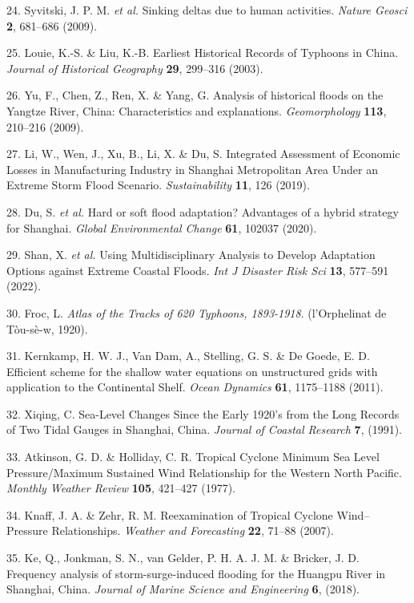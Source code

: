 \documentclass[
]{article}
\begin{document}
24. Syvitski, J. P. M. \emph{et al.} Sinking deltas due to human
activities. \emph{Nature Geosci} \textbf{2}, 681--686 (2009).

25. Louie, K.-S. \& Liu, K.-B. Earliest Historical Records of Typhoons
in China. \emph{Journal of Historical Geography} \textbf{29}, 299--316
(2003).

26. Yu, F., Chen, Z., Ren, X. \& Yang, G. Analysis of historical floods
on the Yangtze River, China: Characteristics and explanations.
\emph{Geomorphology} \textbf{113}, 210--216 (2009).

27. Li, W., Wen, J., Xu, B., Li, X. \& Du, S. Integrated Assessment of
Economic Losses in Manufacturing Industry in Shanghai Metropolitan Area
Under an Extreme Storm Flood Scenario. \emph{Sustainability}
\textbf{11}, 126 (2019).

28. Du, S. \emph{et al.} Hard or soft flood adaptation? Advantages of a
hybrid strategy for Shanghai. \emph{Global Environmental Change}
\textbf{61}, 102037 (2020).

29. Shan, X. \emph{et al.} Using Multidisciplinary Analysis to Develop
Adaptation Options against Extreme Coastal Floods. \emph{Int J Disaster
Risk Sci} \textbf{13}, 577--591 (2022).

30. Froc, L. \emph{Atlas of the Tracks of 620 Typhoons, 1893-1918}.
(l'Orphelinat de Tòu-sè-w, 1920).

31. Kernkamp, H. W. J., Van Dam, A., Stelling, G. S. \& De Goede, E. D.
Efficient scheme for the shallow water equations on unstructured grids
with application to the Continental Shelf. \emph{Ocean Dynamics}
\textbf{61}, 1175--1188 (2011).

32. Xiqing, C. Sea-Level Changes Since the Early 1920's from the Long
Records of Two Tidal Gauges in Shanghai, China. \emph{Journal of Coastal
Research} \textbf{7}, (1991).

33. Atkinson, G. D. \& Holliday, C. R. Tropical Cyclone Minimum Sea
Level Pressure/Maximum Sustained Wind Relationship for the Western North
Pacific. \emph{Monthly Weather Review} \textbf{105}, 421--427 (1977).

34. Knaff, J. A. \& Zehr, R. M. Reexamination of Tropical Cyclone
Wind--Pressure Relationships. \emph{Weather and Forecasting}
\textbf{22}, 71--88 (2007).

35. Ke, Q., Jonkman, S. N., van Gelder, P. H. A. J. M. \& Bricker, J. D.
Frequency analysis of storm-surge-induced flooding for the Huangpu River
in Shanghai, China. \emph{Journal of Marine Science and Engineering}
\textbf{6}, (2018).
\end{document}

